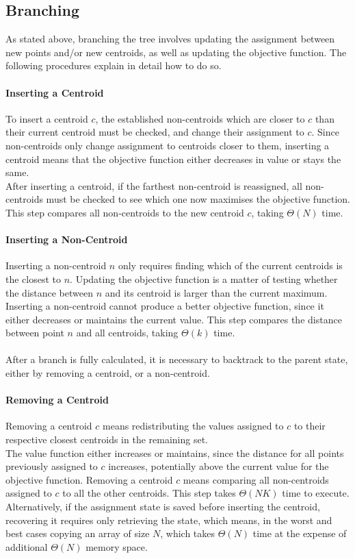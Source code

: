 \subsection{Branching}
As stated above, branching the tree involves updating the assignment between new points and/or new centroids, as well as updating the objective function. The following procedures explain in detail how to do so.
\paragraph{Inserting a Centroid}
To insert a centroid $c$, the established non-centroids which are closer to $c$ than their current centroid must be checked, and change their assignment to $c$.
Since non-centroids only change assignment to centroids closer to them, inserting a centroid means that the objective function either decreases in value or stays the same.\\
After inserting a centroid, if the farthest non-centroid is reassigned, all non-centroids must be checked to see which one now maximises the objective function.
This step compares all non-centroids to the new centroid $c$, taking $\Theta(N)$ time.

\paragraph{Inserting a Non-Centroid}
Inserting a non-centroid $n$ only requires finding which of the current centroids is the closest to $n$. Updating the objective function is a matter of testing whether the distance between $n$ and its centroid is larger than the current maximum.
Inserting a non-centroid cannot produce a better objective function, since it either decreases or maintains the current value. 
This step compares the distance between point $n$ and all centroids, taking $\Theta(k)$ time.
\paragraph{}
After a branch is fully calculated, it is necessary to backtrack to the parent state, either by removing a centroid, or a non-centroid.
\paragraph{Removing a Centroid}
Removing a centroid $c$ means redistributing the values assigned to $c$ to their respective closest centroids in the remaining set. \\
The value function either increases or maintains, since the distance for all points previously assigned to $c$ increases, potentially above the current value for the objective function.
Removing a centroid $c$ means comparing all non-centroids assigned to $c$ to all the other centroids. This step takes $\Theta(NK)$ time to execute. Alternatively, if the assignment state is saved before inserting the centroid, recovering it requires only retrieving the state, which means, in the worst and best cases copying an array of size $N$, which takes $\Theta(N)$ time at the expense of additional $\Theta(N)$ memory space.

